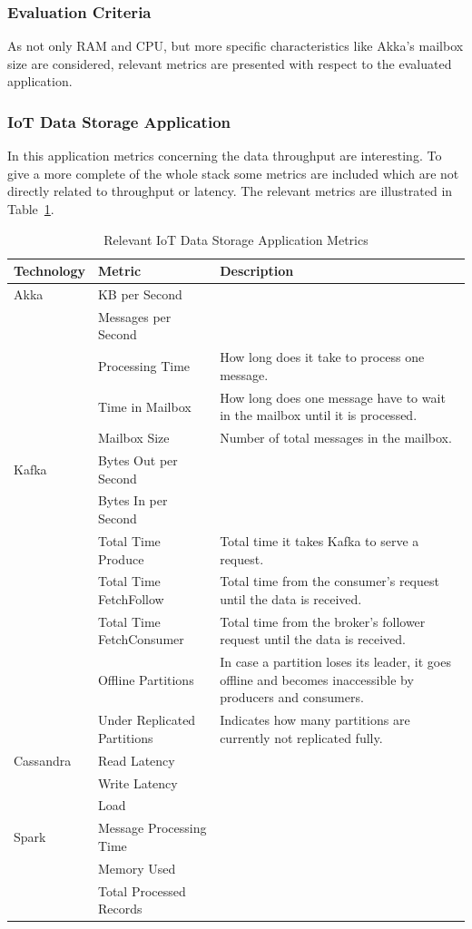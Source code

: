 \subsubsection{Evaluation Criteria}
\label{sec:evaluation_criteria}
As not only RAM and CPU, but more specific characteristics like Akka's mailbox size are considered, relevant metrics are presented with respect to the evaluated application.

\subsubsection{IoT Data Storage Application}
In this application metrics concerning the data throughput are interesting.
To give a more complete of the whole stack some metrics are included which are not directly related to throughput or latency.
The relevant metrics are illustrated in Table~\ref{tab:metrics_iot}.\\

\begin{table}[]
\begin{tabular}{lp{5cm}p{8cm}}
\toprule
Technology & Metric & Description \\ \midrule
Akka & KB per Second & \\
     & Messages per Second & \\
     & Processing Time & How long does it take to process one message.\\
     & Time in Mailbox & How long does one message have to wait in the mailbox until it is processed.\\
     & Mailbox Size & Number of total messages in the mailbox.\\
Kafka & Bytes Out per Second & \\
      & Bytes In per Second & \\
      & Total Time Produce & Total time it takes Kafka to serve a request.\\
      & Total Time FetchFollow & Total time from the consumer's request until the data is received.\\
      & Total Time FetchConsumer & Total time from the broker's follower request until the data is received.\\
      & Offline Partitions & In case a partition loses its leader, it goes offline and becomes inaccessible by producers and consumers.\\
      & Under Replicated Partitions & Indicates how many partitions are currently not replicated fully.\\
Cassandra & Read Latency & \\
          & Write Latency & \\
          & Load & \\
Spark & Message Processing Time & \\
      & Memory Used & \\
      & Total Processed Records & \\
\bottomrule
\end{tabular}
\centering
\caption{Relevant IoT Data Storage Application Metrics}
\label{tab:metrics_iot}
\end{table}

